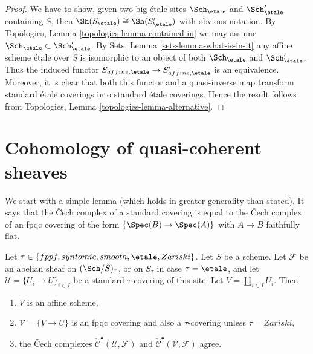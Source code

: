 \begin{proof}
We have to show, given two big \'etale sites
$\Sch_\etale$ and $\Sch_\etale'$ containing
$S$, then $\Sh(S_\etale) \cong \Sh(S_\etale')$
with obvious notation. By Topologies, Lemma \ref{topologies-lemma-contained-in}
we may assume $\Sch_\etale \subset \Sch_\etale'$.
By Sets, Lemma \ref{sets-lemma-what-is-in-it}
any affine scheme \'etale over $S$ is isomorphic to an object
of both $\Sch_\etale$ and $\Sch_\etale'$.
Thus the induced functor
$S_{affine, \etale} \to S_{affine, \etale}'$
is an equivalence. Moreover, it is clear that both this functor
and a quasi-inverse map transform standard \'etale coverings into
standard \'etale coverings.
Hence the result follows from
Topologies, Lemma \ref{topologies-lemma-alternative}.
\end{proof}





\section{Cohomology of quasi-coherent sheaves}
\label{section-cohomology-quasi-coherent}

\noindent
We start with a simple lemma (which holds in greater generality than
stated). It says that the {\v C}ech complex of a standard covering is
equal to the {\v C}ech complex of an fpqc covering of the form
$\{\Spec(B) \to \Spec(A)\}$ with $A \to B$ faithfully flat.

\begin{lemma}
\label{lemma-cech-complex}
Let $\tau \in \{fppf, syntomic, smooth, \etale, Zariski\}$.
Let $S$ be a scheme.
Let $\mathcal{F}$ be an abelian sheaf on $(\Sch/S)_\tau$, or on
$S_\tau$ in case $\tau = \etale$, and let
$\mathcal{U} = \{U_i \to U\}_{i \in I}$
be a standard $\tau$-covering of this site.
Let $V = \coprod_{i \in I} U_i$. Then
\begin{enumerate}
\item $V$ is an affine scheme,
\item $\mathcal{V} = \{V \to U\}$ is an fpqc covering
and also a $\tau$-covering unless $\tau = Zariski$,
\item the {\v C}ech complexes
$\check{\mathcal{C}}^\bullet (\mathcal{U}, \mathcal{F})$ and
$\check{\mathcal{C}}^\bullet (\mathcal{V}, \mathcal{F})$ agree.
\end{enumerate}
\end{lemma}

